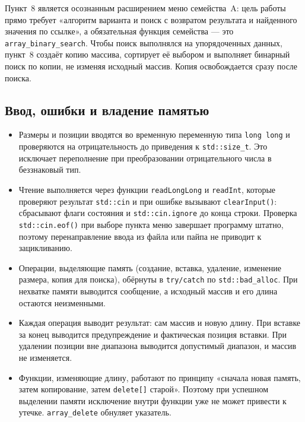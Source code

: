 Пункт~8 является осознанным расширением меню семейства~A: цель работы прямо
требует «алгоритм варианта и поиск с возвратом результата и найденного значения
по ссылке», а обязательная функция семейства --- это
\texttt{array\_binary\_search}. Чтобы поиск выполнялся на упорядоченных данных,
пункт~8 создаёт копию массива, сортирует её выбором и выполняет бинарный поиск
по копии, не изменяя исходный массив. Копия освобождается сразу после поиска.

\subsection{Ввод, ошибки и владение памятью}

\begin{itemize}
  \item Размеры и позиции вводятся во временную переменную типа
        \texttt{long long} и проверяются на отрицательность до приведения к
        \texttt{std::size\_t}. Это исключает переполнение при преобразовании
        отрицательного числа в беззнаковый тип.
  \item Чтение выполняется через функции \texttt{readLongLong} и
        \texttt{readInt}, которые проверяют результат \texttt{std::cin} и при
        ошибке вызывают \texttt{clearInput()}: сбрасывают флаги состояния и
        \texttt{std::cin.ignore} до конца строки. Проверка
        \texttt{std::cin.eof()} при выборе пункта меню завершает программу
        штатно, поэтому перенаправление ввода из файла или пайпа не приводит к
        зацикливанию.
  \item Операции, выделяющие память (создание, вставка, удаление, изменение
        размера, копия для поиска), обёрнуты в \texttt{try/catch} по
        \texttt{std::bad\_alloc}. При нехватке памяти выводится сообщение, а
        исходный массив и его длина остаются неизменными.
  \item Каждая операция выводит результат: сам массив и новую длину. При
        вставке за конец выводится предупреждение и фактическая позиция
        вставки. При удалении позиции вне диапазона выводится допустимый
        диапазон, и массив не изменяется.
  \item Функции, изменяющие длину, работают по принципу «сначала новая память,
        затем копирование, затем \texttt{delete[]} старой». Поэтому при
        успешном выделении памяти исключение внутри функции уже не может
        привести к утечке. \texttt{array\_delete} обнуляет указатель.
\end{itemize}

